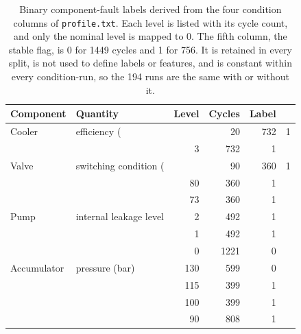 \begin{table}[t]
\centering
\caption{Binary component-fault labels derived from the four condition columns of \texttt{profile.txt}. Each level is listed with its cycle count, and only the nominal level is mapped to 0. The fifth column, the stable flag, is 0 for 1449 cycles and 1 for 756. It is retained in every split, is not used to define labels or features, and is constant within every condition-run, so the 194 runs are the same with or without it.}
\label{tab:labelmap}
\footnotesize
\setlength{\tabcolsep}{4pt}
\begin{tabular}{llrrr}
\toprule
Component & Quantity & Level & Cycles & Label \\
\midrule
Cooler & efficiency (%
 &  & 20 & 732 & 1 \\
 &  & 3 & 732 & 1 \\
\midrule
Valve & switching condition (%
 &  & 90 & 360 & 1 \\
 &  & 80 & 360 & 1 \\
 &  & 73 & 360 & 1 \\
\midrule
Pump & internal leakage level & 2 & 492 & 1 \\
 &  & 1 & 492 & 1 \\
 &  & 0 & 1221 & 0 \\
\midrule
Accumulator & pressure (bar) & 130 & 599 & 0 \\
 &  & 115 & 399 & 1 \\
 &  & 100 & 399 & 1 \\
 &  & 90 & 808 & 1 \\
\bottomrule
\end{tabular}
\end{table}
